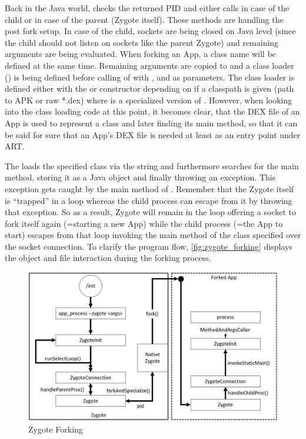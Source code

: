 Back in the Java world,  checks the returned PID and either calls  in case of the child or
 in case of the parent (Zygote itself).
These methods are handling the post fork setup. In case of the child, sockets are being closed on Java level (since the child should not listen on sockets like the parent Zygote) and remaining arguments are being evaluated. When forking an App, a class name will be defined at the same time. Remaining arguments are copied to  and a class loader () is being defined before calling  of  with ,  and  as parameters. The class loader  is defined
either with the  or  constructor depending on if a classpath is
given (path to APK or raw *.dex) where  is a specialized version of .
However, when looking into the class loading code at this point, it becomes clear, that the DEX file of an App is used to represent a class and later finding its main method, so that
it can be said for sure that an App's DEX file is needed at least as an entry point under ART.

The  loads the specified class via the  string and furthermore searches for the main method, storing it as a Java  object and finally throwing an
 exception. This exception gets caught by the main method of .
Remember that the Zygote itself is ``trapped'' in a loop whereas the child process can escape from it by throwing that exception. So as a result, Zygote will remain in the loop offering a socket to fork itself again (=starting a new App) while the child process (=the App to start) escapes from that loop invoking the main method of the class specified over the socket
connection.
To clarify the program flow, \autoref{fig:zygote_forking} displays
the object and file interaction during the forking process.

\begin{figure}[htb]
  \centering
  \includegraphics[width={\textwidth}]{figures/zygote_forking}
  \caption[Zygote Forking]{Zygote Forking}
  \label{fig:zygote_forking}
\end{figure}


